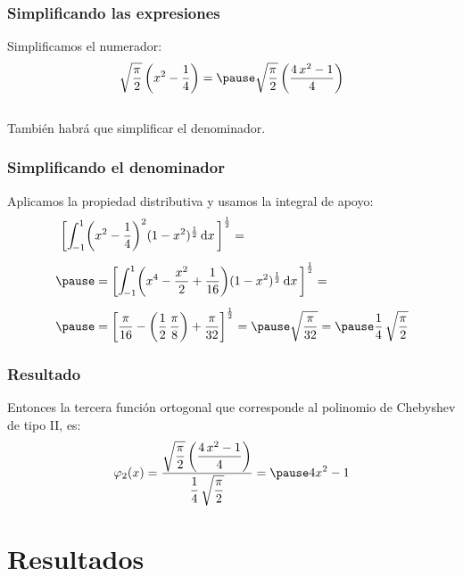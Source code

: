 \documentclass[12pt]{beamer}
\begin{document}
\begin{frame}
\frametitle{Simplificando las expresiones}
Simplificamos el numerador:
\pause
\begin{eqnarray*}
\begin{aligned}
\sqrt{\dfrac{\pi}{2}} \, \bigg( x^{2} - \dfrac{1}{4} \bigg) = \pause \sqrt{\dfrac{\pi}{2}} \,\bigg( \dfrac{4 \, x^{2} - 1}{4} \bigg) %
\end{aligned}
\end{eqnarray*}
\\
\bigskip
\pause
También habrá que simplificar el denominador.
\end{frame}
\begin{frame}
\frametitle{Simplificando el denominador}
Aplicamos la propiedad distributiva y usamos la integral de apoyo:
\begin{eqnarray*}
\begin{aligned}
\bigg[ \scaleint{5ex}_{\bs -1}^{1} \bigg( &x^{2} - \dfrac{1}{4} \bigg)^{2} (1 -x^{2})^{\frac{1}{2}} \dd{x} \bigg]^{\frac{1}{2}} = \\[0.5em] \pause
&= \bigg[ \scaleint{5ex}_{\bs -1}^{1} \bigg( x^{4} - \dfrac{x^{2}}{2} + \dfrac{1}{16} \bigg) (1 -x^{2})^{\frac{1}{2}} \dd{x} \bigg]^{\frac{1}{2}} = \\[0.5em] \pause
&= \bigg[ \dfrac{\pi}{16} - \left( \dfrac{1}{2} \, \dfrac{\pi}{8} \right) + \dfrac{\pi}{32} \bigg]^{\frac{1}{2}} = \pause \sqrt{\dfrac{\pi}{32}} = \pause \dfrac{1}{4} \, \sqrt{\dfrac{\pi}{2}}
\end{aligned}
\end{eqnarray*}
\end{frame}
\begin{frame}
\frametitle{Resultado}
Entonces la tercera función ortogonal que corresponde al polinomio de Chebyshev de tipo II, es:
\pause
\begin{eqnarray*}
\begin{aligned}
\varphi_{2}(x) = \dfrac{\sqrt{\dfrac{\pi}{2}} \,\bigg( \dfrac{4 \, x^{2} - 1}{4} \bigg)}{\dfrac{1}{4} \, \sqrt{\dfrac{\pi}{2}}} = \pause 4 x^{2} - 1
\end{aligned}
\end{eqnarray*}
\end{frame}

\section{Resultados}
\end{document}
